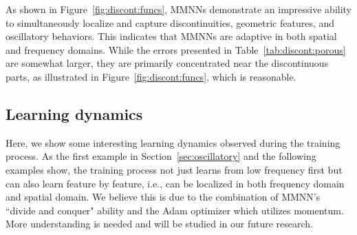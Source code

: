 \documentclass[review,hidelinks,onefignum,onetabnum]{siamart250211}
\begin{document}
\begin{table}[htbp!]
	\centering  
 \setlength{\tabcolsep}{0.68em} 
 \renewcommand{\arraystretch}{1.15}
\caption{
Test errors for two approximation results in Figure~\ref{fig:discont:funcs}.
}
\label{tab:discont:porous}
\end{table} 

As shown in Figure~\ref{fig:discont:funcs}, MMNNs demonstrate an impressive ability to simultaneously localize and capture discontinuities, geometric features, and oscillatory behaviors. This indicates that MMNNs are adaptive in both spatial and frequency domains. 
While the errors presented in Table~\ref{tab:discont:porous} are somewhat larger, they are primarily concentrated near the discontinuous parts, as illustrated in Figure~\ref{fig:discont:funcs}, which is reasonable.


\subsection{Learning dynamics}\label{sec:dynamics}


Here,
we show some interesting learning dynamics observed during the training process. As the first example in Section~\ref{sec:oscillatory} and the following examples show, the training process not just learns from low frequency first but can also learn feature by feature, i.e., can be localized in both frequency domain and spatial domain. We believe this is due to the combination of MMNN's ``divide and conquer" ability and the Adam optimizer which utilizes momentum. More understanding is needed and will be studied in our future research.
\end{document}
